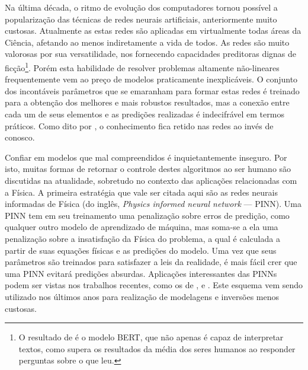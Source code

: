  
 
  Na última década, o ritmo de evolução dos computadores tornou possível a popularização das técnicas de redes neurais artificiais, anteriormente muito custosas. Atualmente as estas redes são aplicadas em virtualmente todas áreas da Ciência, afetando ao menos indiretamente a vida de todos. As redes são muito valorosas por sua versatilidade, nos fornecendo capacidades preditoras dignas de ficção\footnote{O resultado de  é o modelo BERT, que não apenas é capaz de interpretar textos, como supera os resultados da média dos seres humanos ao responder perguntas sobre o que leu.}. Porém esta habilidade de resolver problemas altamente não-lineares frequentemente vem ao preço de modelos praticamente inexplicáveis. O conjunto dos incontáveis parâmetros que se emaranham para formar estas redes é treinado para a obtenção dos melhores e mais robustos resultados, mas a conexão entre cada um de seus elementos e as predições realizadas é indecifrável em termos práticos. Como dito por , o conhecimento fica retido nas redes ao invés de conosco.

  Confiar em modelos que mal compreendidos é inquietantemente inseguro. Por isto, muitas formas de retornar o controle destes algoritmos ao ser humano são discutidas na atualidade, sobretudo no contexto das aplicações relacionadas com a Física. A primeira estratégia que vale ser citada aqui são as redes neurais informadas de Física (do inglês, \textit{Physics informed neural network} --- PINN). Uma PINN tem em seu treinamento uma penalização sobre erros de predição, como qualquer outro modelo de aprendizado de máquina, mas soma-se a ela uma penalização sobre a insatisfação da Física do problema, a qual é calculada a partir de suas equações físicas e as predições do modelo. Uma vez que seus parâmetros são treinados para satisfazer a leis da realidade, é mais fácil crer que uma PINN evitará predições absurdas. Aplicações interessantes das PINNs podem ser vistas nos trabalhos recentes, como os de ,  e . Este esquema vem sendo utilizado nos últimos anos para realização de modelagens e inversões menos custosas.

